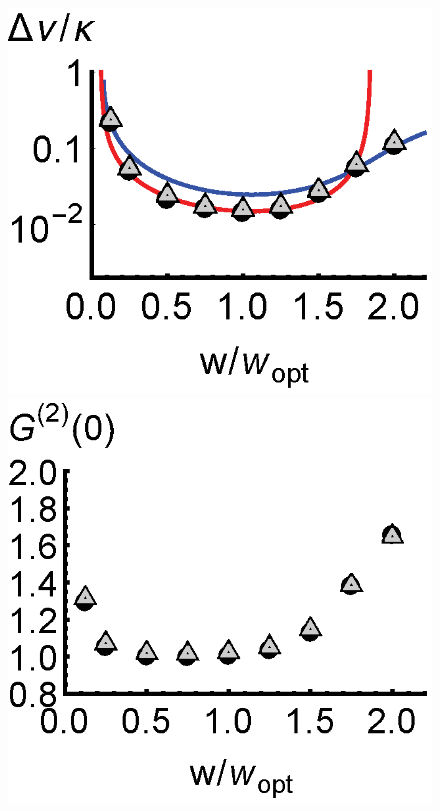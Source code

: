 \documentclass[aps,prl,twocolumn,
superscriptaddress,groupedaddress]{revtex4}
\begin{document}
\begin{figure}
\begin{center}
	\hspace{-5.0mm} \includegraphics[scale =0.38] {N40CrossoverLW.eps}
	\hspace{-5.0mm} \includegraphics[scale =0.38] {N40CrossoverG2.eps}\\ \vspace{0mm}

\end{center}
\end{figure}
\end{document}
